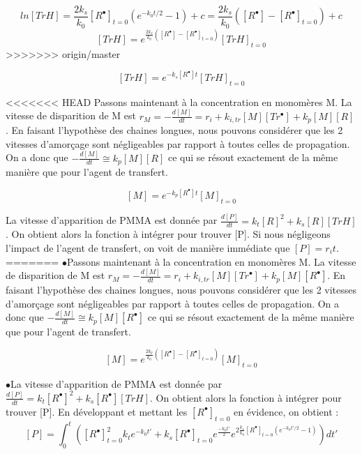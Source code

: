 \documentclass[a4paper,oneside,12pt]{article}
\begin{document}
$$ln[TrH]=\frac{2k_{s}}{k_0}[R^{\bullet}]_{t=0}(e^{-k_{0}t/2} - 1)+c=\frac{2k_{s}}{k_0}([R^{\bullet}]-[R^{\bullet}]_{t=0})+c$$
$$[TrH]=e^{\frac{2k_{s}}{k_0}([R^{\bullet}]-[R^{\bullet}]_{t=0})}[TrH]_{t=0}$$
>>>>>>> origin/master

$$[TrH]=e^{-k_s[R^{\bullet}]t}[TrH]_{t=0}$$

<<<<<<< HEAD
Passons maintenant à la concentration en monomères M. La vitesse de disparition de M est $r_M = -\frac{d[M]}{dt}=r_{i}+k_{i,tr}[M][Tr^{\bullet}]+k_{p}[M][R]$. En faisant l'hypothèse des chaines longues, nous pouvons considérer que les 2 vitesses d'amorçage sont négligeables par rapport à toutes celles de propagation. On a donc que $-\frac{d[M]}{dt}\cong k_{p}[M][R]$ ce qui se résout exactement de la même manière que pour l'agent de transfert.

$$[M]=e^{-k_p[R^{\bullet}]t}[M]_{t=0}$$

La vitesse d'apparition de PMMA est donnée par $\frac{d[P]}{dt}=k_{t}[R]^2+k_{s}[R][TrH]$. On obtient alors la fonction à intégrer pour trouver [P]. Si nous négligeons l'impact de l'agent de transfert, on voit de manière immédiate que $[P]=r_i t$. %
=======
$\bullet$Passons maintenant à la concentration en monomères M. La vitesse de disparition de M est $r_M = -\frac{d[M]}{dt}=r_{i}+k_{i,tr}[M][Tr^{\bullet}]+k_{p}[M][R^{\bullet}]$. En faisant l'hypothèse des chaines longues, nous pouvons considérer que les 2 vitesses d'amorçage sont négligeables par rapport à toutes celles de propagation. On a donc que $-\frac{d[M]}{dt}\cong k_{p}[M][R^{\bullet}]$ ce qui se résout exactement de la même manière que pour l'agent de transfert.

$$[M]=e^{\frac{2k_{p}}{k_0}([R^{\bullet}]-[R^{\bullet}]_{t=0})}[M]_{t=0}$$

$\bullet$La vitesse d'apparition de PMMA est donnée par $\frac{d[P]}{dt}=k_{t}[R^{\bullet}]^2+k_{s}[R^{\bullet}][TrH]$. On obtient alors la fonction à intégrer pour trouver [P]. En développant et mettant les $[R^{\bullet}]_{t=0}$ en évidence, on obtient :
$$[P]=\int_{0}^t ([R^{\bullet}]^{2}_{t=0}k_te^{-k_0t'}+k_s[R^{\bullet}]_{t=0}e^{\frac{-k_0t'}{2}}e^{2\frac{k_s}{k_0}[R^{\bullet}]_{t=0}(e^{-k_0t'/2}-1)})dt'$$
\end{document}
